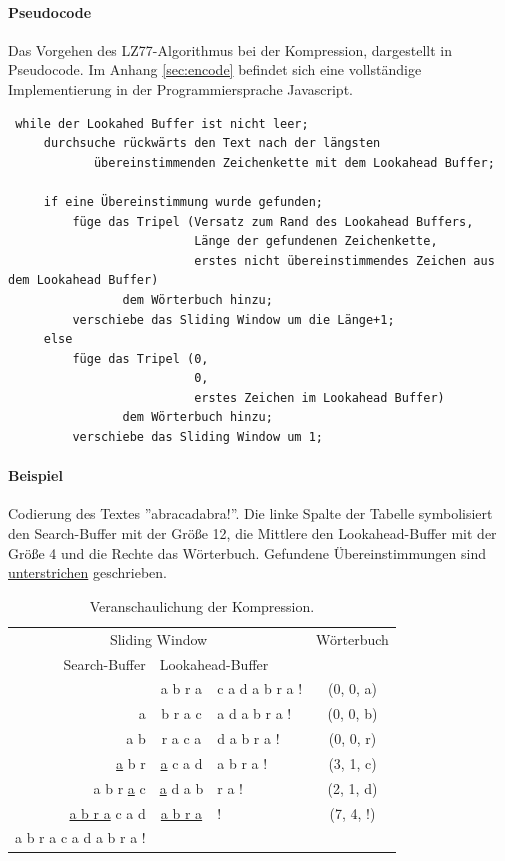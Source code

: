\documentclass[10pt, a4paper]{article}
\begin{document}
\vspace{5mm}
\paragraph{Pseudocode}
Das Vorgehen des LZ77-Algorithmus bei der Kompression, dargestellt in Pseudocode. Im Anhang \ref{sec:encode} befindet sich eine vollständige Implementierung in der Programmiersprache Javascript.
\begin{verbatim}
 while der Lookahed Buffer ist nicht leer;
     durchsuche rückwärts den Text nach der längsten 
            übereinstimmenden Zeichenkette mit dem Lookahead Buffer;
     
     if eine Übereinstimmung wurde gefunden;
         füge das Tripel (Versatz zum Rand des Lookahead Buffers,
                          Länge der gefundenen Zeichenkette,
                          erstes nicht übereinstimmendes Zeichen aus dem Lookahead Buffer)
                dem Wörterbuch hinzu;
         verschiebe das Sliding Window um die Länge+1;
     else
         füge das Tripel (0,
                          0, 
                          erstes Zeichen im Lookahead Buffer) 
                dem Wörterbuch hinzu;
         verschiebe das Sliding Window um 1;
\end{verbatim}

\vspace{5mm}
\paragraph{Beispiel}
Codierung des Textes ''abracadabra!''. Die linke Spalte der Tabelle symbolisiert den Search-Buffer mit der Größe 12, die Mittlere den Lookahead-Buffer mit der Größe 4 und die Rechte das Wörterbuch. Gefundene Übereinstimmungen sind \underline{unterstrichen} geschrieben.

\begin{table}[H]
    \centering
    \begin{tabular}{r|c|l|c}
        \multicolumn{3}{c|}{Sliding Window} & Wörterbuch \\
        Search-Buffer & \multicolumn{2}{l|}{Lookahead-Buffer} & \\
        \hline
         & a b r a & c a d a b r a ! & (0, 0, a) \\
        \hline
        a &  b r a c & a d a b r a ! & (0, 0, b) \\
        \hline
        a b & r a c a & d a b r a ! & (0, 0, r) \\
        \hline
        \underline{a} b r & \underline{a} c a d & a b r a ! & (3, 1, c) \\
        \hline
        a b r \underline{a} c & \underline{a} d a b & r a ! & (2, 1, d) \\
        \hline
        \underline{a b r a} c a d & \underline{a b r a} & ! & (7, 4, !) \\
        \hline
        a b r a c a d a b r a ! & & \\
        \hline
    \end{tabular}
    \caption{Veranschaulichung der Kompression.}
    \label{tab:codierung}
\end{table}
\end{document}
